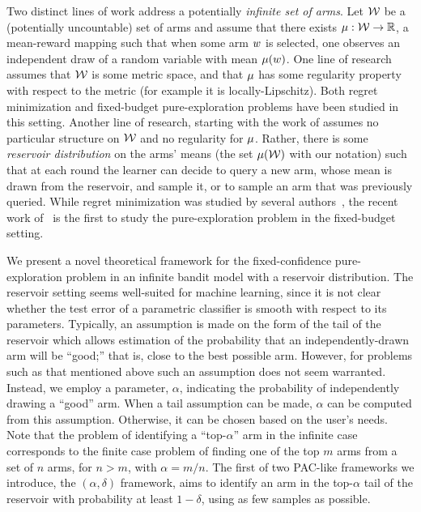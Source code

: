 Two distinct lines of work address a
potentially \emph{infinite set of arms}. Let $\mathcal{W}$ be a (potentially
uncountable) set of arms and assume that there exists $\mu : \mathcal{W} \rightarrow
\mathbb{R}$, a mean-reward mapping such that when some arm $w$ is selected, one observes
an independent draw of a random variable with mean $\mu(w)$.
One line of research
\citep{Kleinberg08Infinite,Bubeck11Xarmed,grill2015black-box}
assumes that $\mathcal{W}$ is some
metric space, and that $\mu$ has some regularity property with respect to the
metric (for example it is locally-Lipschitz). Both regret minimization and
fixed-budget pure-exploration problems have been studied in this setting.
Another line of research, starting with the work
of \cite{berry1997} assumes no particular structure on $\mathcal{W}$ and no regularity
for $\mu$. Rather, there is some \emph{reservoir distribution} on the arms'
means (the set $\mu(\mathcal{W})$ with our notation) such that at each round the
learner can decide to query a new arm, whose mean is drawn from the reservoir,
and sample it, or to sample an arm that was previously queried. While regret
minimization was studied by several authors~\citep{NIPS2008_3452,
NIPS2013_5109,10.1007/978-3-662-44848-9_20}, the recent work
of~\cite{DBLP:journals/corr/CarpentierV15} is the first to study the
pure-exploration problem in the fixed-budget setting.


We present a novel theoretical framework for the
fixed-confidence pure-exploration problem in an infinite bandit model with a
reservoir distribution.
The reservoir setting seems well-suited for machine learning, since it is not clear whether the
test error of a parametric classifier is smooth with respect to its parameters.
Typically, an assumption is made on the form of the tail of the reservoir which allows
estimation of the probability that an independently-drawn arm will be
``good;'' that is, close to the best possible arm.
However, for problems 
such as that mentioned above
 such an assumption does not seem warranted.
Instead, we employ a parameter, $\alpha$, indicating the probability of
independently drawing a ``good'' arm.
When a tail assumption can be made, $\alpha$ can be computed from this
assumption. Otherwise, it can be chosen based on the user's needs.
Note that the problem of identifying a ``top-$\alpha$'' arm in the infinite
case corresponds to the finite case problem of
finding one of the top $m$ arms from a set of $n$ arms, for $n>m$,
with $\alpha = m/n$.
The first of two PAC-like frameworks we introduce, the $(\alpha,\delta)$
framework,
aims to identify an arm in the top-$\alpha$ tail of the reservoir with 
probability at least $1-\delta$, using as few samples as
possible.

